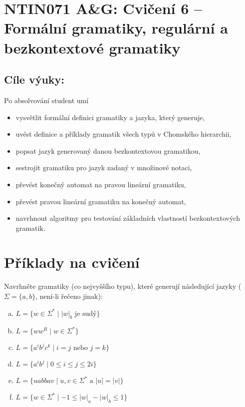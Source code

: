 \documentclass[a4paper,12pt]{amsart}
\begin{document}
\thispagestyle{empty}

\section*{NTIN071 A\&G: Cvičení 6 -- Formální gramatiky, regulární a bezkontextové gramatiky}

\medskip

\subsection*{Cíle výuky:} Po absolvování student umí

\begin{itemize}\setlength{\itemsep}{0pt}
    \item vysvětlit formální definici gramatiky a jazyka, který generuje,
    \item uvést definice a příklady gramatik všech typů v Chomského hierarchii,
    \item popsat jazyk generovaný danou bezkontextovou gramatikou,
    \item sestrojit gramatiku pro jazyk zadaný v množinové notaci,
    \item převést konečný automat na pravou lineární gramatiku,
    \item převést pravou lineární gramatiku na konečný automat,
    \item navrhnout algoritmy pro testování základních vlastností bezkontextových gramatik.
\end{itemize}


\section*{Příklady na cvičení}


\medskip\begin{problem}

    Navrhněte gramatiky (co nejvyššího typu), které generují následující jazyky ($\Sigma=\{a,b\}$, není-li řečeno jinak):
    
    \vspace{-3pt}
    \begin{multicols}{2}
    \begin{enumerate}[(a)]
        \item $L=\{w\in\Sigma^*\mid |w|_b\text{ je sudý}\} $
        \item $L=\{ww^R\mid w\in \Sigma^*\}$        
        \item $L = \{a^ib^jc^k\mid i = j\text{ nebo }j = k\}$        
        \item $L=\{a^i b^j\mid 0\leq i\leq j\leq 2i\}$
        \item $L=\{uabbav\mid u,v\in\Sigma^*\text{ a }|u|=|v|\}$
        \item $L=\{w\in \Sigma^*\mid -1\leq |w|_a-|w|_b\leq 1\}$        
    \end{enumerate}
    \end{multicols}

\end{problem}
\end{document}
